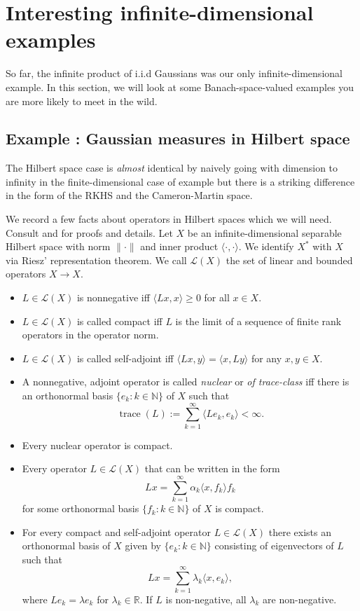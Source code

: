\documentclass{scrartcl}
\theoremstyle{definition}
\theoremstyle{remark}
\newcommand{\N}{\mathbb N}
\newcommand{\R}{\mathbb R}
\newcommand*\circled[1]{\tikz[baseline=(char.base)]{
            \node[shape=circle,draw,inner sep=2pt] (char) {#1};}}
\DeclareRobustCommand{\myboxtwo}[2][blue!20]{%
\begin{tcolorbox}[   %
        breakable,
        left=0pt,
        right=0pt,
        top=0pt,
        bottom=0pt,
        colback=#1,
        colframe=#1,
        width=\dimexpr\textwidth\relax, 
        enlarge left by=0mm,
        boxsep=5pt,
        arc=10pt,outer arc=10pt,
        ]
        #2
\end{tcolorbox}
}
\begin{document}
\section{Interesting infinite-dimensional examples}\label{sec:InfDimEx}
So far, the infinite product of i.i.d Gaussians was our only infinite-dimensional example. In this section, we will look at some Banach-space-valued examples you are more likely to meet in the wild.
\myboxtwo{
\subsection*{Example \circled{4}: Gaussian measures in Hilbert space}
The Hilbert space case is \textit{almost} identical by naively going with dimension to infinity in the finite-dimensional case of example \circled{1} but there is a striking difference in the form of the RKHS and the Cameron-Martin space.

We record a few facts about operators in Hilbert spaces which we will need. Consult \cite{Lunardi} and \cite{brezis2010functional} for proofs and details. Let $X$ be an infinite-dimensional separable Hilbert space with norm $\|\cdot\|$ and inner product $\langle\cdot,\cdot\rangle$. We identify $X^*$ with $X$ via Riesz' representation theorem. We call $\mathcal L(X)$ the set of linear and bounded operators $X\to X$.
\begin{itemize}
\item $L\in \mathcal L(X)$ is nonnegative iff $\langle Lx,x\rangle \geq 0$ for all $x\in X$.
\item $L\in \mathcal L(X)$ is called compact iff $L$ is the limit of a sequence of finite rank operators in the operator norm.
\item $L\in \mathcal L(X)$ is called self-adjoint iff $\langle Lx, y\rangle = \langle x, Ly\rangle$ for any $x,y\in X$.
\item A nonnegative, adjoint operator is called \textit{nuclear} or \textit{of trace-class} iff there is an orthonormal basis $\{e_k: k\in\N\}$ of $X$ such that 
\[\operatorname{trace}(L) := \sum_{k=1}^\infty \langle Le_k,e_k\rangle < \infty.\]
\item Every nuclear operator is compact.
\item Every operator $L\in\mathcal L(X)$ that can be written in the form
\[Lx = \sum_{k=1}^\infty \alpha_k \langle x, f_k\rangle f_k \]
for some orthonormal basis $\{f_k:k\in\N\}$ of $X$ is compact.
\item For every compact and self-adjoint operator $L\in\mathcal L(X)$ there exists an orthonormal basis of $X$ given by $\{e_k:k\in\N\}$ consisting of eigenvectors of $L$ such that 
\begin{equation}\label{eq:formGaussianHilbert} Lx = \sum_{k=1}^\infty \lambda_k \langle x, e_k\rangle,
\end{equation}
where $Le_k = \lambda e_k$ for $\lambda_k\in\R$. If $L$ is non-negative, all $\lambda_k$ are non-negative.
\end{itemize}
}
\end{document}
